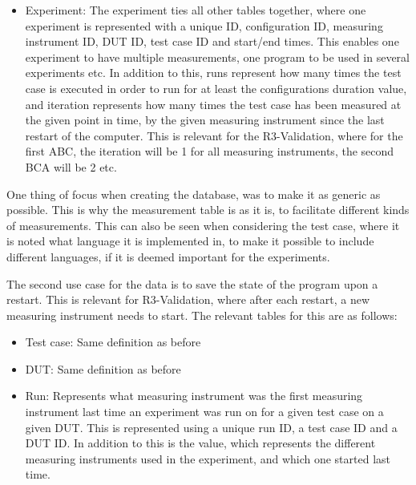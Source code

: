 \begin{itemize}
    \item Experiment: The experiment ties all other tables together, where one experiment is represented with a unique ID, configuration ID, measuring instrument ID, DUT ID, test case ID and start/end times. This enables one experiment to have multiple measurements, one program to be used in several experiments etc. In addition to this, runs represent how many times the test case is executed in order to run for at least the configurations duration value, and iteration represents how many times the test case has been measured at the given point in time, by the given measuring instrument since the last restart of the computer. This is relevant for the R3-Validation, where for the first ABC, the iteration will be 1 for all measuring instruments, the second BCA will be 2 etc.
\end{itemize}

One thing of focus when creating the database, was to make it as generic as possible. This is why the measurement table is as it is, to facilitate different kinds of measurements. This can also be seen when considering the test case, where it is noted what language it is implemented in, to make it possible to include different languages, if it is deemed important for the experiments.


The second use case for the data is to save the state of the program upon a restart. This is relevant for R3-Validation, where after each restart, a new measuring instrument needs to start. The relevant tables for this are as follows:

\begin{itemize}
    \item Test case: Same definition as before
    \item DUT: Same definition as before
    \item Run: Represents what measuring instrument was the first measuring instrument last time an experiment was run on for a given test case on a given DUT. This is represented using a unique run ID, a test case ID and a DUT ID. In addition to this is the value, which represents the different measuring instruments used in the experiment, and which one started last time.
\end{itemize}

